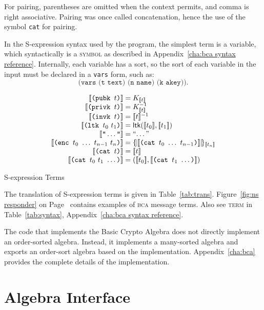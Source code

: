 \documentclass[12pt]{report}
\theoremstyle{definition}
\begin{document}
For pairing, parentheses are omitted when the context permits, and
comma is right associative.  Pairing was once called concatenation,
hence the use of the symbol \texttt{cat} for pairing.

In the S-expression syntax used by the program, the simplest term is a
variable, which syntactically is a \textsc{symbol} as described in
Appendix~\ref{cha:bca syntax reference}.  Internally, each variable
has a sort, so the sort of each variable in the input must be declared
in a \texttt{vars} form, such as:
$$\texttt{(vars (t text) (n name) (k akey))}.$$

\begin{table}
$$\begin{array}{r@{}c@{}l}
\sembrack{\texttt{(pubk~}t\texttt{)}}&{}={}&K_{\sembrack{t}}\\
\sembrack{\texttt{(privk~}t\texttt{)}}&{}={}&K_{\sembrack{t}}^{-1}\\
\sembrack{\texttt{(invk~}t\texttt{)}}&{}={}&\sembrack{t}^{-1}\\
\sembrack{\texttt{(ltk~}t_0~t_1\texttt{)}}&{}={}&
\cn{ltk}(\sembrack{t_0},\sembrack{t_1})\\
\sembrack{\texttt{"}\ldots\texttt{"}}&{}={}&\mbox{``\ldots''}\\
\sembrack{\texttt{(enc~}t_0~\ldots~t_{n-1}~t_n\texttt{)}}&{}={}&
\enc{\sembrack{\texttt{(cat~}t_0~\ldots~t_{n-1}\texttt{)}}}{\sembrack{t_n}}\\
\sembrack{\texttt{(cat~}t\texttt{)}}&{}={}&\sembrack{t}\\
\sembrack{\texttt{(cat~}t_0~t_1~\ldots\texttt{)}}&{}={}&
(\sembrack{t_0},\sembrack{\texttt{(cat~}t_1~\ldots\texttt{)}})

\end{array}$$
\caption{S-expression Terms}\label{tab:trans}
\end{table}

The translation of S-expression terms is given in
Table~\ref{tab:trans}.  Figure~\ref{fig:ns responder} on
Page~\pageref{fig:ns responder} contains examples of \textsc{bca}
message terms.  Also see \textsc{term} in Table~\ref{tab:syntax},
Appendix~\ref{cha:bca syntax reference}.

The code that implements the Basic Crypto Algebra does not directly
implement an order-sorted algebra.  Instead, it implements a
many-sorted algebra and exports an order-sort algebra based on the
implementation.  Appendix~\ref{cha:bca} provides the complete details
of the implementation.

\section{Algebra Interface}
\end{document}
